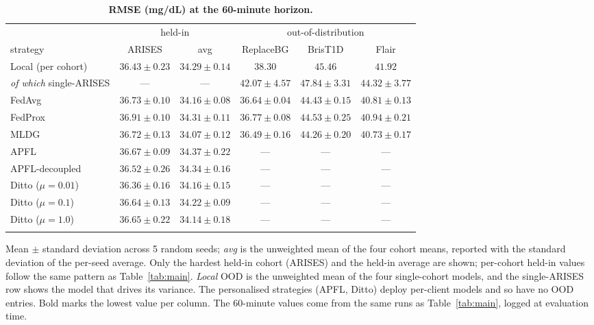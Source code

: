 \documentclass[10pt,letterpaper]{article}
\newlength\savedwidth
\newcommand\thickhline{\noalign{\global\savedwidth\arrayrulewidth\global\arrayrulewidth 2pt}%
\hline
\noalign{\global\arrayrulewidth\savedwidth}}
\begin{document}
\begin{table}[!ht]
\centering
\captionsetup{justification=centering,singlelinecheck=on}
\caption{\bf RMSE (mg/dL) at the 60-minute horizon.}
\label{tab:h60}
\begin{tabular}{lccccc}
\thickhline
 & \multicolumn{2}{c}{held-in} & \multicolumn{3}{c}{out-of-distribution} \\
strategy & ARISES & avg & ReplaceBG & BrisT1D & Flair \\
\hline
Local (per cohort) & $36.43 \pm 0.23$ & $34.29 \pm 0.14$ & $38.30$ & $45.46$ & $41.92$ \\
\;\emph{of which} single-ARISES & --- & --- & $42.07 \pm 4.57$ & $47.84 \pm 3.31$ & $44.32 \pm 3.77$ \\
\hline
FedAvg  & $36.73 \pm 0.10$ & $34.16 \pm 0.08$ & $36.64 \pm 0.04$ & $44.43 \pm 0.15$ & $40.81 \pm 0.13$ \\
FedProx & $36.91 \pm 0.10$ & $34.31 \pm 0.11$ & $36.77 \pm 0.08$ & $44.53 \pm 0.25$ & $40.94 \pm 0.21$ \\
MLDG    & $36.72 \pm 0.13$ & $\mathbf{34.07 \pm 0.12}$ & $\mathbf{36.49 \pm 0.16}$ & $\mathbf{44.26 \pm 0.20}$ & $\mathbf{40.73 \pm 0.17}$ \\
\hline
APFL           & $36.67 \pm 0.09$ & $34.37 \pm 0.22$ & --- & --- & --- \\
APFL-decoupled & $36.52 \pm 0.26$ & $34.34 \pm 0.16$ & --- & --- & --- \\
Ditto ($\mu{=}0.01$) & $\mathbf{36.36 \pm 0.16}$ & $34.16 \pm 0.15$ & --- & --- & --- \\
Ditto ($\mu{=}0.1$)  & $36.64 \pm 0.13$ & $34.22 \pm 0.09$ & --- & --- & --- \\
Ditto ($\mu{=}1.0$)  & $36.65 \pm 0.22$ & $34.14 \pm 0.18$ & --- & --- & --- \\
\thickhline
\end{tabular}
\begin{center}
{\small Mean $\pm$ standard deviation across 5 random seeds; \emph{avg} is the
unweighted mean of the four cohort means, reported with the standard deviation
of the per-seed average. Only the hardest held-in cohort (ARISES) and the
held-in average are shown; per-cohort held-in values follow the same pattern as
Table~\ref{tab:main}. \emph{Local} OOD is the unweighted mean of the four
single-cohort models, and the single-ARISES row shows the model that drives its
variance. The personalised strategies (APFL, Ditto) deploy per-client models and
so have no OOD entries. Bold marks the lowest value per column. The 60-minute
values come from the same runs as Table~\ref{tab:main}, logged at evaluation
time.}
\end{center}
\end{table}
\end{document}
